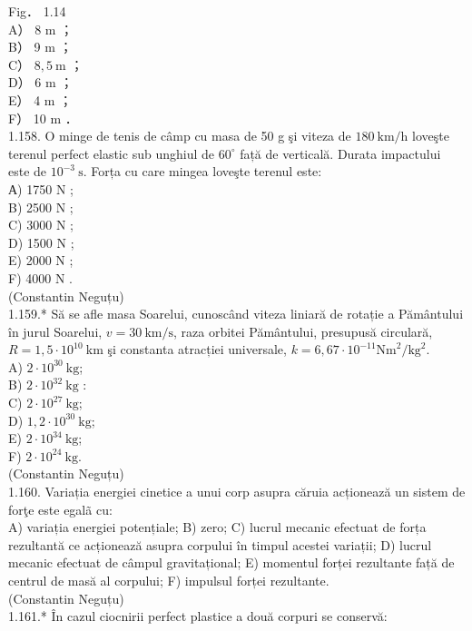 \documentclass[10pt]{article}
\begin{document}
Fig． 1.14\\
A） 8 m ；\\
B） 9 m ；\\
C） $8,5 \mathrm{~m}$ ；\\
D） 6 m ；\\
E） 4 m ；\\
F） 10 m ．\\
1.158. O minge de tenis de câmp cu masa de 50 g şi viteza de $180 \mathrm{~km} / \mathrm{h}$ loveşte terenul perfect elastic sub unghiul de $60^{\circ}$ față de verticală. Durata impactului este de $10^{-3} \mathrm{~s}$. Forța cu care mingea loveşte terenul este:\\
А) 1750 N ;\\
B) 2500 N ;\\
C) 3000 N ;\\
D) 1500 N ;\\
E) 2000 N ;\\
F) 4000 N .\\
(Constantin Neguțu)\\
1.159.* Să se afle masa Soarelui, cunoscând viteza liniară de rotație a Pământului în jurul Soarelui, $v=30 \mathrm{~km} / \mathrm{s}$, raza orbitei Pământului, presupusă circulară, $R=1,5 \cdot 10^{10} \mathrm{~km}$ şi constanta atracției universale, $k=6,67 \cdot 10^{-11} \mathrm{Nm}^{2} / \mathrm{kg}^{2}$.\\
A) $2 \cdot 10^{30} \mathrm{~kg}$;\\
B) $2 \cdot 10^{32} \mathrm{~kg}$ :\\
C) $2 \cdot 10^{27} \mathrm{~kg}$;\\
D) $1,2 \cdot 10^{30} \mathrm{~kg}$;\\
E) $2 \cdot 10^{34} \mathrm{~kg}$;\\
F) $2 \cdot 10^{24} \mathrm{~kg}$.\\
(Constantin Neguțu)\\
1.160. Variația energiei cinetice a unui corp asupra căruia acționează un sistem de forţe este egalã cu:\\
A) variația energiei potențiale; B) zero; C) lucrul mecanic efectuat de forța rezultantă ce acționează asupra corpului în timpul acestei variații; D) lucrul mecanic efectuat de câmpul gravitațional; E) momentul forței rezultante față de centrul de masă al corpului; F) impulsul forței rezultante.\\
(Constantin Neguțu)\\
1.161.* În cazul ciocnirii perfect plastice a două corpuri se conservă:\\
\end{document}
